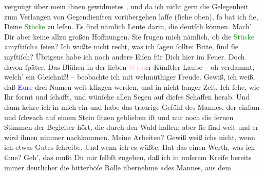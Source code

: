                vergnügt über mein ihnen gewidmetes \label{K_L02719-7v}\label{K_L02719-7h}, und da ich nicht gern
                   die Gelegenheit zum Verlangen von
               Gegendienſten vorübergehen laſſe (ſiehe oben), ſo bat ich ſie, Deine \textcolor{green}{Stücke}{} zu leſen. Es ſind nämlich
               Leute darin, die deutſch können. Mach’ Dir aber keine allzu großen Hoffnungen.  Sie frugen mich nämlich, ob die \textcolor{green}{Stücke}{} »myſtiſch« ſeien? Ich
               wußte nicht recht, was {\pb}ich ſagen ſollte: Bitte,
               ſind ſie myſtiſch?\pend
           \pstart
           Übrigens habe ich noch andere Eiſen für Dich hier im Feuer. Doch davon ſpäter.\pend
           \pstart
           Das Blühen in der lieben \textcolor{pink}{Wien}{}\ledrightnote{\textcolor{pink}{Wien}}er Künſtler-Laube –
               oh verdammt, welch’ ein Gleichniß! – beobachte ich mit wehmüthiger Freude. Gewiß, ich
               weiß, daß \textcolor{blue}{Eure}{} drei Namen weit klingen werden, und in nicht langer Zeit. Ich ſehe, wie
               Ihr formt und ſchafft, und wünſche allen Segen {\pb}auf
               dieſes Schaffen herab. Und dann kehre ich in mich ein und habe das traurige Gefühl
               des Mannes, der einſam und ſchwach auf einem Stein ſitzen geblieben iſt und nur noch
               die fernen Stimmen der Begleiter hört, die durch den Wald hallen: aber ſie ſind weit
               und er wird ihnen nimmer nachkommen. Meine Arbeiten? Gewiß weiß ichs nicht, wenn ich
               etwas Gutes ſchreibe. Und wenn ich es wüßte: Hat das einen Werth, was ich thue? Geh’,
               das mußt {\pb}Du mir ſelbſt zugeben, daß ich in unſerem
               Kreiſe bereits immer deutlicher die bitterböſe Rolle übernehme »des Mannes, aus dem
